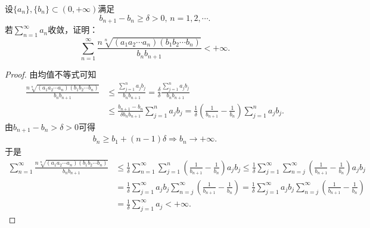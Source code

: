 \documentclass[../../main.tex]{subfiles}
\begin{document}
\begin{example}
设$\{a_n\},\{b_n\} \subset (0,+\infty)$满足
\[ b_{n + 1} - b_n \geqslant \delta > 0, \, n = 1,2,\cdots. \]
若$\sum_{n = 1}^{\infty} a_n$收敛，证明：
\[ \sum_{n = 1}^{\infty} \frac{n\sqrt[n]{(a_1 a_2 \cdots a_n)(b_1 b_2 \cdots b_n)}}{b_n b_{n + 1}} < +\infty. \]
\end{example}
\begin{proof}
由均值不等式可知
\begin{align*}
\frac{n\sqrt[n]{(a_1a_2\cdots a_n)(b_1b_2\cdots b_n)}}{b_nb_{n+1}}&\leqslant \frac{\sum\limits_{j=1}^n{a_jb_j}}{b_nb_{n+1}}=\frac{\delta}{\delta}\frac{\sum\limits_{j=1}^n{a_jb_j}}{b_nb_{n+1}} \\
&\leqslant \frac{b_{n+1}-b_n}{\delta b_nb_{n+1}}\sum_{j=1}^n{a_jb_j}=\frac{1}{\delta}\left( \frac{1}{b_{n+1}}-\frac{1}{b_n} \right) \sum_{j=1}^n{a_jb_j}.
\end{align*}
由$b_{n+1}-b_n>\delta >0$可得
\begin{align*}
b_n\geqslant b_1+\left( n-1 \right) \delta \Longrightarrow b_n\rightarrow +\infty .
\end{align*}
于是
\begin{align*}
\sum_{n=1}^{\infty}{\frac{n\sqrt[n]{(a_1a_2\cdots a_n)(b_1b_2\cdots b_n)}}{b_nb_{n+1}}}&\leqslant \frac{1}{\delta}\sum_{n=1}^{\infty}{\sum_{j=1}^n{\left( \frac{1}{b_{n+1}}-\frac{1}{b_n} \right) a_jb_j}}\leqslant \frac{1}{\delta}\sum_{j=1}^{\infty}{\sum_{n=j}^{\infty}{\left( \frac{1}{b_{n+1}}-\frac{1}{b_n} \right) a_jb_j}}
\\
&=\frac{1}{\delta}\sum_{j=1}^{\infty}{a_jb_j\sum_{n=j}^{\infty}{\left( \frac{1}{b_{n+1}}-\frac{1}{b_n} \right)}}=\frac{1}{\delta}\sum_{j=1}^{\infty}{a_jb_j\sum_{n=j}^{\infty}{\left( \frac{1}{b_{n+1}}-\frac{1}{b_n} \right)}}
\\
&=\frac{1}{\delta}\sum_{j=1}^{\infty}{a_j}<+\infty .
\end{align*}
\end{proof}
\end{document}
